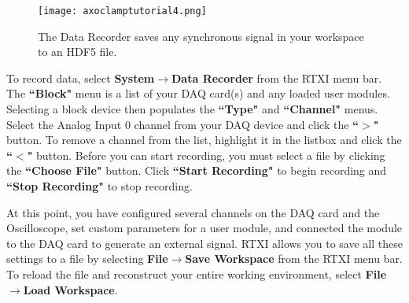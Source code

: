 \begin{figure}[h!]
\begin{maxipage}
\begin{center}
\texttt{[image: axoclamptutorial4.png]} 
\caption[Data Recorder]{The Data Recorder saves any synchronous signal in your workspace to an HDF5 file.} 
\end{center}
\end{maxipage}
\end{figure}

To record data, select \textbf{System}$\rightarrow$\textbf{Data Recorder} from the RTXI menu bar. The \textbf{``Block"} menu is a list of your DAQ card(s) and any loaded user modules. Selecting a block device then populates the \textbf{``Type"} and \textbf{``Channel"} menus. Select the Analog Input 0 channel from your DAQ device and click the \textbf{``$>$"} button. To remove a channel from the list, highlight it in the listbox and click the \textbf{``$<$"} button. Before you can start recording, you must select a file by clicking the \textbf{``Choose File"} button. Click \textbf{``Start Recording"} to begin recording and \textbf{``Stop Recording"} to stop recording.

\vspace{1cm}
At this point, you have configured several channels on the DAQ card and the Oscilloscope, set custom parameters for a user module, and connected the module to the DAQ card to generate an external signal. RTXI allows you to save all these settings to a file by selecting \textbf{File}$\rightarrow$\textbf{Save Workspace} from the RTXI menu bar. To reload the file and reconstruct your entire working environment, select   \textbf{File}$\rightarrow$\textbf{Load Workspace}.